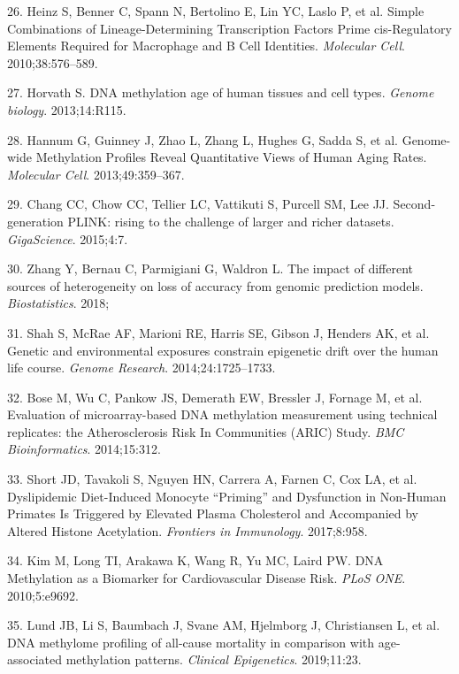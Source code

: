 \documentclass[]{article}
\begin{document}
\leavevmode\hypertarget{ref-Heinz2010}{}%
26. Heinz S, Benner C, Spann N, Bertolino E, Lin YC, Laslo P, et al.
Simple Combinations of Lineage-Determining Transcription Factors Prime
cis-Regulatory Elements Required for Macrophage and B Cell Identities.
\emph{Molecular Cell}. 2010;38:576--589.

\leavevmode\hypertarget{ref-Horvath2013}{}%
27. Horvath S. DNA methylation age of human tissues and cell types.
\emph{Genome biology}. 2013;14:R115.

\leavevmode\hypertarget{ref-Hannum2013}{}%
28. Hannum G, Guinney J, Zhao L, Zhang L, Hughes G, Sadda S, et al.
Genome-wide Methylation Profiles Reveal Quantitative Views of Human
Aging Rates. \emph{Molecular Cell}. 2013;49:359--367.

\leavevmode\hypertarget{ref-Chang2015}{}%
29. Chang CC, Chow CC, Tellier LC, Vattikuti S, Purcell SM, Lee JJ.
Second-generation PLINK: rising to the challenge of larger and richer
datasets. \emph{GigaScience}. 2015;4:7.

\leavevmode\hypertarget{ref-Zhang2018}{}%
30. Zhang Y, Bernau C, Parmigiani G, Waldron L. The impact of different
sources of heterogeneity on loss of accuracy from genomic prediction
models. \emph{Biostatistics}. 2018;

\leavevmode\hypertarget{ref-Shah2014}{}%
31. Shah S, McRae AF, Marioni RE, Harris SE, Gibson J, Henders AK, et
al. Genetic and environmental exposures constrain epigenetic drift over
the human life course. \emph{Genome Research}. 2014;24:1725--1733.

\leavevmode\hypertarget{ref-Bose2014}{}%
32. Bose M, Wu C, Pankow JS, Demerath EW, Bressler J, Fornage M, et al.
Evaluation of microarray-based DNA methylation measurement using
technical replicates: the Atherosclerosis Risk In Communities (ARIC)
Study. \emph{BMC Bioinformatics}. 2014;15:312.

\leavevmode\hypertarget{ref-Short2017}{}%
33. Short JD, Tavakoli S, Nguyen HN, Carrera A, Farnen C, Cox LA, et al.
Dyslipidemic Diet-Induced Monocyte ``Priming'' and Dysfunction in
Non-Human Primates Is Triggered by Elevated Plasma Cholesterol and
Accompanied by Altered Histone Acetylation. \emph{Frontiers in
Immunology}. 2017;8:958.

\leavevmode\hypertarget{ref-Kim2010}{}%
34. Kim M, Long TI, Arakawa K, Wang R, Yu MC, Laird PW. DNA Methylation
as a Biomarker for Cardiovascular Disease Risk. \emph{PLoS ONE}.
2010;5:e9692.

\leavevmode\hypertarget{ref-Lund2019}{}%
35. Lund JB, Li S, Baumbach J, Svane AM, Hjelmborg J, Christiansen L, et
al. DNA methylome profiling of all-cause mortality in comparison with
age-associated methylation patterns. \emph{Clinical Epigenetics}.
2019;11:23.
\end{document}
